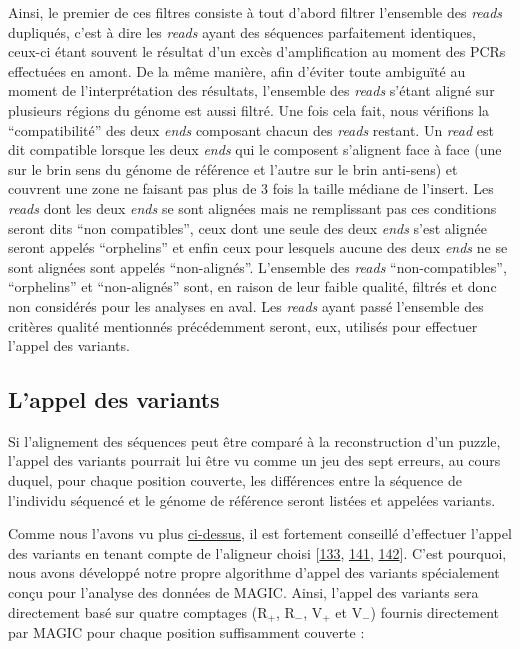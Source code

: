 \documentclass[12pt,a4paper,twoside]{ugathesis}
\theoremstyle{definition}
\theoremstyle{definition}
\theoremstyle{definition}
\theoremstyle{remark}
\begin{document}
Ainsi, le premier de ces filtres consiste à tout d'abord filtrer
l'ensemble des \emph{reads} dupliqués, c'est à dire les \emph{reads}
ayant des séquences parfaitement identiques, ceux-ci étant souvent le
résultat d'un excès d'amplification au moment des PCRs effectuées en
amont. De la même manière, afin d'éviter toute ambiguïté au moment de
l'interprétation des résultats, l'ensemble des \emph{reads} s'étant
aligné sur plusieurs régions du génome est aussi filtré. Une fois cela
fait, nous vérifions la ``compatibilité'' des deux \emph{ends} composant
chacun des \emph{reads} restant. Un \emph{read} est dit compatible
lorsque les deux \emph{ends} qui le composent s'alignent face à face
(une sur le brin sens du génome de référence et l'autre sur le brin
anti-sens) et couvrent une zone ne faisant pas plus de 3 fois la taille
médiane de l'insert. Les \emph{reads} dont les deux \emph{ends} se sont
alignées mais ne remplissant pas ces conditions seront dits ``non
compatibles'', ceux dont une seule des deux \emph{ends} s'est alignée
seront appelés ``orphelins'' et enfin ceux pour lesquels aucune des deux
\emph{ends} ne se sont alignées sont appelés ``non-alignés''. L'ensemble
des \emph{reads} ``non-compatibles'', ``orphelins'' et ``non-alignés''
sont, en raison de leur faible qualité, filtrés et donc non considérés
pour les analyses en aval. Les \emph{reads} ayant passé l'ensemble des
critères qualité mentionnés précédemment seront, eux, utilisés pour
effectuer l'appel des variants.

\newpage

\subsection{L'appel des variants}\label{lappel-des-variants}

Si l'alignement des séquences peut être comparé à la reconstruction d'un
puzzle, l'appel des variants pourrait lui être vu comme un jeu des sept
erreurs, au cours duquel, pour chaque position couverte, les différences
entre la séquence de l'individu séquencé et le génome de référence
seront listées et appelées variants.

Comme nous l'avons vu plus \protect\hyperlink{varcall}{ci-dessus}, il
est fortement conseillé d'effectuer l'appel des variants en tenant
compte de l'aligneur choisi {[}\protect\hyperlink{ref-Nielsen2011}{133},
\protect\hyperlink{ref-DePristo2011}{141},
\protect\hyperlink{ref-Lunter2011}{142}{]}. C'est pourquoi, nous avons
développé notre propre algorithme d'appel des variants spécialement
conçu pour l'analyse des données de MAGIC. Ainsi, l'appel des variants
sera directement basé sur quatre comptages (R\(_+\), R\(_-\), V\(_+\) et
V\(_-\)) fournis directement par MAGIC pour chaque position suffisamment
couverte :
\end{document}
